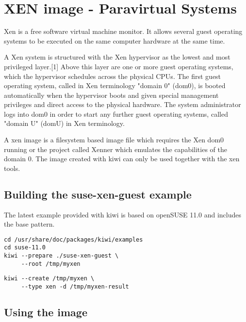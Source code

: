\chapter{XEN image - Paravirtual Systems}
\label{chapter:xen}
\minitoc

Xen is a free software virtual machine monitor. It allows several
guest operating systems to be executed on the same computer hardware
at the same time.

A Xen system is structured with the Xen hypervisor as the lowest and
most privileged layer.[1] Above this layer are one or more guest
operating systems, which the hypervisor schedules across the physical
CPUs. The first guest operating system, called in Xen terminology
"domain 0" (dom0), is booted automatically when the hypervisor boots
and given special management privileges and direct access to the physical
hardware. The system administrator logs into dom0 in order to start
any further guest operating systems, called "domain U" (domU) in
Xen terminology.

A xen image is a filesystem based image file which requires the
Xen dom0 running or the project called Xenner which emulates
the capabilities of the domain 0. The image created with kiwi
can only be used together with the xen tools.

\section{Building the suse-xen-guest example}

The latest example provided with kiwi is based on openSUSE 11.0 and includes
the base pattern. 

\begin{Command}{12cm}
\begin{verbatim}
cd /usr/share/doc/packages/kiwi/examples
cd suse-11.0
kiwi --prepare ./suse-xen-guest \
     --root /tmp/myxen
\end{verbatim}
\end{Command}

\begin{Command}{12cm}
\begin{verbatim}
kiwi --create /tmp/myxen \
     --type xen -d /tmp/myxen-result
\end{verbatim}
\end{Command}

\section{Using the image}

